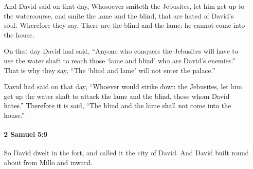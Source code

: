 			\begin{versebox}
					\item[BHS] 
					\item[ASV] And David said on that day, Whosoever smiteth the Jebusites, let him get up to the watercourse, and smite the lame and the blind, that are hated of David's soul. Wherefore they say, There are the blind and the lame; he cannot come into the house.
					\item[NIV] On that day David had said, “Anyone who conquers the Jebusites will have to use the water shaft to reach those ‘lame and blind’ who are David’s enemies.” That is why they say, “The ‘blind and lame’ will not enter the palace.”
					\item[NRSV] David had said on that day, “Whoever would strike down the Jebusites, let him get up the water shaft to attack the lame and the blind, those whom David hates.” Therefore it is said, “The blind and the lame shall not come into the house.”
			\end{versebox}

		\paragraph{2 Samuel 5:9} %
			\label{2SAMUEL-5-9}

			So David dwelt in the fort, and called it the city of David. And David built round about from Millo and inward.

